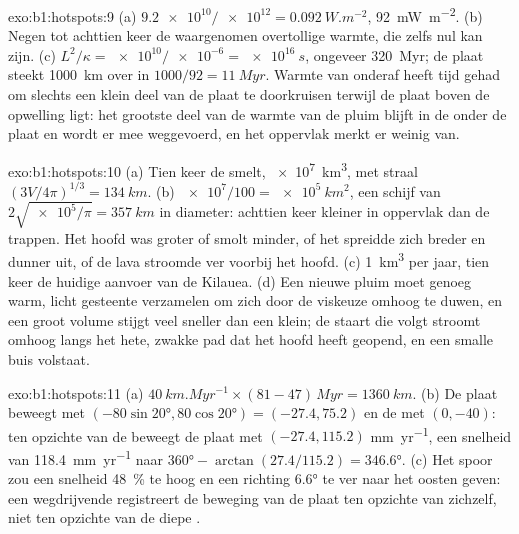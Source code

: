 \begin{solution}{exo:b1:hotspots:9}
(a) $\num{9.2e10}/\num{e12} = \qty{0.092}{W.m^{-2}}$, \qty{92}{mW.m^{-2}}.
(b) Negen tot achttien keer de waargenomen overtollige warmte, die zelfs nul kan zijn.
(c) $L^2/\kappa =
\num{e10}/\num{e-6} = \qty{e16}{s}$, ongeveer \qty{320}{Myr}; de plaat steekt
\qty{1000}{km} over in $1000/92 = \qty{11}{Myr}$. Warmte van onderaf heeft tijd gehad om
slechts een klein deel van de plaat te doorkruisen terwijl de plaat boven de opwelling ligt: het grootste deel van de
warmte van de pluim blijft in de  onder de plaat en wordt er mee weggevoerd, en het
oppervlak merkt er weinig van.
\end{solution}

\begin{solution}{exo:b1:hotspots:10}
(a) Tien keer de smelt, \qty{e7}{km^3}, met straal
$(3V/4\pi)^{1/3} = \qty{134}{km}$. (b) $\num{e7}/100 = \qty{e5}{km^2}$, een schijf van
$2\sqrt{\num{e5}/\pi} = \qty{357}{km}$ in diameter: achttien keer kleiner in oppervlak dan de
trappen. Het hoofd was groter of smolt minder, of het spreidde zich breder en dunner uit,
of de lava stroomde ver voorbij het hoofd. (c) \qty{1}{km^3} per jaar, tien
keer de huidige aanvoer van de Kilauea. (d) Een nieuwe pluim moet genoeg warm, licht gesteente
verzamelen om zich door de viskeuze  omhoog te duwen, en een groot volume stijgt veel
sneller dan een klein; de staart die volgt stroomt omhoog langs het hete, zwakke pad dat het hoofd heeft geopend,
en een smalle buis volstaat.
\end{solution}

\begin{solution}{exo:b1:hotspots:11}
(a) $\qty{40}{km.Myr^{-1}}\times(81 - 47)\,\unit{Myr} = \qty{1360}{km}$.
(b) De plaat beweegt met $(-80\sin\ang{20}, 80\cos\ang{20}) = (-27.4, 75.2)$
en de  met $(0, -40)$: ten opzichte van de  beweegt de plaat met
$(-27.4, 115.2)$ \unit{mm.yr^{-1}}, een snelheid van \qty{118.4}{mm.yr^{-1}} naar
$\ang{360} - \arctan(27.4/115.2) = \ang{346.6}$. (c) Het spoor zou een
snelheid \qty{48}{\percent} te hoog en een richting \ang{6.6} te ver naar het oosten geven:
een wegdrijvende  registreert de beweging van de plaat ten opzichte van zichzelf, niet ten opzichte van de diepe .
\end{solution}

